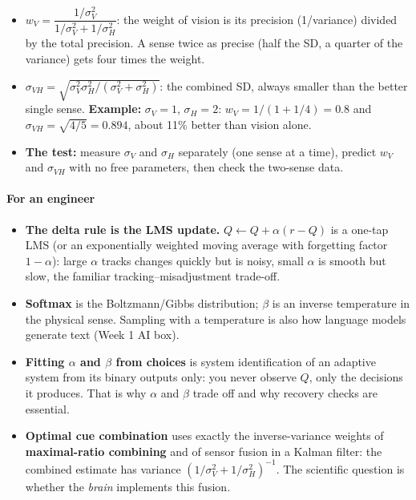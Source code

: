 \begin{itemize}
\tightlist
\item
  \(w_V = \dfrac{1/\sigma_V^2}{1/\sigma_V^2 + 1/\sigma_H^2}\): the
  weight of vision is its precision (1/variance) divided by the total
  precision. A sense twice as precise (half the SD, a quarter of the
  variance) gets four times the weight.
\item
  \(\sigma_{VH} = \sqrt{\sigma_V^2\sigma_H^2/(\sigma_V^2 + \sigma_H^2)}\):
  the combined SD, always smaller than the better single sense.
  \textbf{Example:} \(\sigma_V = 1\), \(\sigma_H = 2\):
  \(w_V = 1/(1 + 1/4) = 0.8\) and \(\sigma_{VH} = \sqrt{4/5} = 0.894\),
  about 11\% better than vision alone.
\item
  \textbf{The test:} measure \(\sigma_V\) and \(\sigma_H\) separately
  (one sense at a time), predict \(w_V\) and \(\sigma_{VH}\) with no
  free parameters, then check the two-sense data.
\end{itemize}

\paragraph{For an engineer}

\begin{itemize}
\tightlist
\item
  \textbf{The delta rule is the LMS update.}
  \(Q \leftarrow Q + \alpha(r - Q)\) is a one-tap LMS (or an
  exponentially weighted moving average with forgetting factor
  \(1-\alpha\)): large \(\alpha\) tracks changes quickly but is noisy,
  small \(\alpha\) is smooth but slow, the familiar
  tracking--misadjustment trade-off.
\item
  \textbf{Softmax} is the Boltzmann/Gibbs distribution; \(\beta\) is an
  inverse temperature in the physical sense. Sampling with a temperature
  is also how language models generate text (Week 1 AI box).
\item
  \textbf{Fitting \(\alpha\) and \(\beta\) from choices} is system
  identification of an adaptive system from its binary outputs only: you
  never observe \(Q\), only the decisions it produces. That is why
  \(\alpha\) and \(\beta\) trade off and why recovery checks are
  essential.
\item
  \textbf{Optimal cue combination} uses exactly the inverse-variance
  weights of \textbf{maximal-ratio combining} and of sensor fusion in a
  Kalman filter: the combined estimate has variance
  \((1/\sigma_V^2 + 1/\sigma_H^2)^{-1}\). The scientific question is
  whether the \emph{brain} implements this fusion.
\end{itemize}

